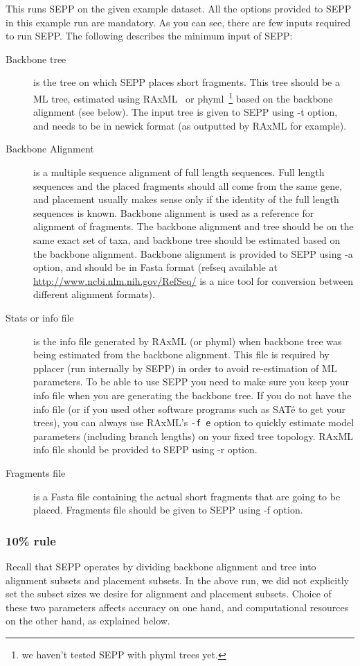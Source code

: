 \documentclass[11pt]{article} %
\newcommand{\sepp}{SEPP\xspace}
\newcommand{\ins}[1]{{\tt #1}}
\newcommand{\sate}{SAT\'{e}\xspace}
\newcommand{\raxml}{RAxML\xspace}
\begin{document}
This runs \sepp on the given example dataset. All the options provided to \sepp in this example run are mandatory. As you can see, there are few inputs required to run \sepp. The following describes the minimum input of \sepp:
\begin {description}
\item[Backbone tree] is the tree on which \sepp places short fragments. This tree should be a ML tree, estimated using \raxml~\cite{raxml} or phyml~\cite{phyml}\footnote{we haven't tested \sepp with phyml trees yet.} based on the backbone alignment (see below). The input tree is given to \sepp using -t option, and needs to be in newick format (as outputted by \raxml for example). 
\item[Backbone Alignment] is a multiple sequence alignment of full length sequences. Full length sequences and the placed fragments should all come from the same gene, and placement usually makes sense only if the identity of the full length sequences is known. Backbone alignment is used as a reference for alignment of fragments. The backbone alignment and tree should be on the same exact set of taxa, and backbone tree should be estimated based on the backbone alignment. Backbone alignment is provided to \sepp using -a option, and should be in Fasta format (refseq available  at \url{http://www.ncbi.nlm.nih.gov/RefSeq/} is a nice tool for conversion between different alignment formats). 
\item[Stats or info file] is the info file generated by RAxML (or phyml) when backbone tree was being estimated from the backbone alignment. This file is required by pplacer (run internally by \sepp) in order to avoid re-estimation of ML parameters. To be able to use \sepp you need to make sure you keep your info file when you are generating the backbone tree. If you do not have the info file (or if you used other software programs such as \sate to get your trees), you can always use RAxML's \ins{-f e} option to quickly estimate model parameters (including branch lengths) on your fixed tree topology. RAxML info file should be provided to \sepp using -r option. 
\item[Fragments file] is a Fasta file containing the actual short fragments that are going to be placed. Fragments file should be given to \sepp using -f option. 
\end{description}

\subsubsection{10\% rule}
Recall that \sepp operates by dividing backbone alignment and tree into alignment subsets and placement subsets. In the above run, we did not explicitly set the subset sizes we desire for alignment and placement subsets. Choice of these two parameters affects accuracy on one hand, and computational resources on the other hand, as explained below. 
\end{document}
